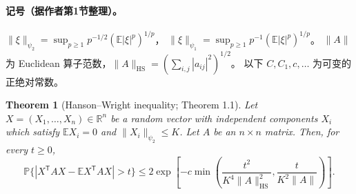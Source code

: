 \documentclass[UTF8,11pt]{ctexart}
\newtheorem*{theorem}{Theorem}
\theoremstyle{definition}
\begin{document}
\paragraph{记号（据作者第1节整理）。}
$\|\xi\|_{\psi_2}=\sup_{p\geq1}p^{-1/2}(\mathbb E|\xi|^p)^{1/p}$，
$\|\xi\|_{\psi_1}=\sup_{p\geq1}p^{-1}(\mathbb E|\xi|^p)^{1/p}$。
$\|A\|$ 为 Euclidean 算子范数，$\|A\|_{\mathrm{HS}}=(\sum_{i,j}|a_{ij}|^2)^{1/2}$。
以下 $C,C_1,c,\ldots$ 为可变的正绝对常数。
\begin{theorem}[Hanson--Wright inequality; Theorem 1.1]
Let $X=(X_1,\ldots,X_n)\in\mathbb R^n$ be a random vector with independent
components $X_i$ which satisfy $\mathbb E X_i=0$ and $\|X_i\|_{\psi_2}\leq K$.
Let $A$ be an $n\times n$ matrix. Then, for every $t\geq0$,
\[
\mathbb P\{|X^{\mathsf T}AX-\mathbb E X^{\mathsf T}AX|>t\}
\leq2\exp\left[-c\min\left(\frac{t^2}{K^4\|A\|_{\mathrm{HS}}^2},
\frac{t}{K^2\|A\|}\right)\right].
\]
\end{theorem}
\end{document}
